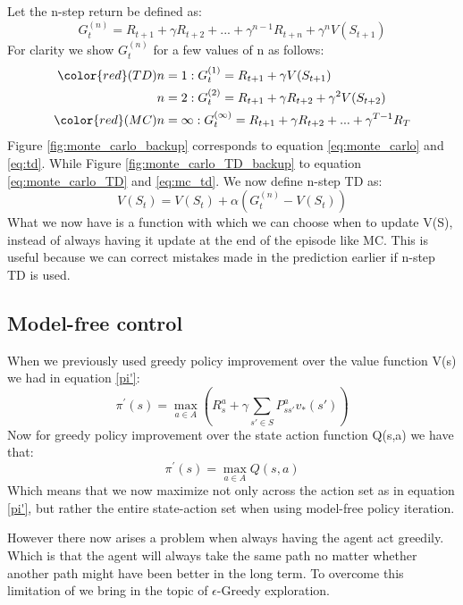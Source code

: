 Let the n-step return be defined as:
\begin{equation}
	G_{t}^{(n)} = R_{t+1} + \gamma R_{t+2} + ... + \gamma^{n-1}R_{t+n} + \gamma^{n}V(S_{t+1})
\end{equation}
For clarity we show 
$G_{t}^{(n)}$ for a few values of n as follows:\\
\begin{align}
	 {\color{red}(TD)} n &= 1: G_{t}^{(1)} = R_{t+1}+\gamma V(S_{t+1}) \label{eq:td} \\
	n &= 2 : G_{t}^{(2)} = R_{t+1}+ \gamma R_{t+2}+\gamma^2 V(S_{t+2}) \\
	{\color{red}(MC)} n &= \infty : G_{t}^{(\infty)} = R_{t+1}+ \gamma R_{t+2}+...+\gamma^{T-1} R_T \label{eq:mc_td}
\end{align}
Figure \ref{fig:monte_carlo_backup} corresponds to equation \ref{eq:monte_carlo} and \ref{eq:td}. While Figure \ref{fig:monte_carlo_TD_backup} to equation \ref{eq:monte_carlo_TD} and \ref{eq:mc_td}. We now define n-step TD as:
\begin{equation}
	V(S_t) = V(S_t) + \alpha(G_t^{(n)} - V(S_t))
	\label{eq:n_step_TD}
\end{equation} 
What we now have is a function with which we can choose when to update V(S), instead of always having it update at the end of the episode like MC. This is useful because we can correct mistakes made in the prediction earlier if n-step TD is used.
\subsection{Model-free control}

When we previously used greedy policy improvement over the value function V(s) we had in equation \ref{pi'}:
\[\pi^{'}(s) = \max\limits_{a \in A}(R^{a}_s+\gamma\sum_{s'\in S}P^{a}_{ss'}v_*(s'))\]
Now for greedy policy improvement over the state action function Q(s,a) we have that:
\begin{equation}
	\pi^{'}(s) = \max\limits_{a \in A}Q(s,a)
\end{equation}
Which means that we now maximize not only across the action set as in equation \ref{pi'}, but rather the entire state-action set when using model-free policy iteration.

However there now arises a problem when always having the agent act greedily. Which is that the agent will always take the same path no matter whether another path might have been better in the long term. To overcome this limitation of we bring in the topic of $\epsilon$-Greedy exploration.

